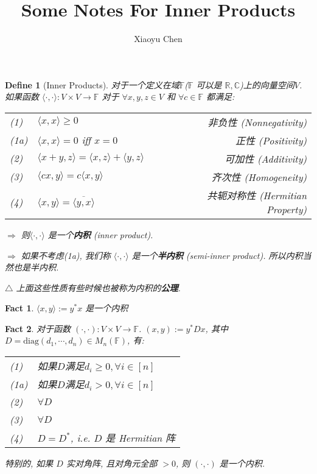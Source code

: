 \documentclass{article}
\title{Some Notes For Inner Products}
\author{Xiaoyu Chen}
\date{}
\newtheorem{define}{Define}
\newtheorem{fact}{Fact}
\def\<{\langle}
\def\>{\rangle}
\begin{document}
\maketitle
\begin{define}[Inner Products]
  对于一个定义在域$\mathbb{F}$($\mathbb{F}$ 可以是 $\mathbb{R}, \mathbb{C}$)上的向量空间$V$. 如果函数 $\< \cdot, \cdot \>: V\times V \to \mathbb{F}$ 对于 $\forall x, y, z\in V$ 和 $\forall c\in \mathbb{F}$ 都满足:

  \begin{tabularx}{0.9\textwidth}{llXr}
    (1) & $\< x, x \> \geq 0$ && 非负性 (Nonnegativity) \\
    (1a) & $\< x, x \> = 0$ iff $x = 0$ && 正性 (Positivity) \\
    (2) & $\< x + y, z \> = \< x, z \> + \< y, z \>$ && 可加性 (Additivity) \\
    (3) & $\< cx, y \> = c\< x, y \>$ && 齐次性 (Homogeneity) \\
    (4) & $\< x , y \> = \overline{\< y, x \>}$ && 共轭对称性 (Hermitian Property) \\
  \end{tabularx}

  $\Rightarrow$ 则$\< \cdot, \cdot \>$ 是一个\textbf{内积} (inner product). 
  
  $\Rightarrow$ 如果不考虑(1a), 我们称 $\<\cdot, \cdot\>$ 是一个\textbf{半内积} (semi-inner product). 所以内积当然也是半内积.

  $\triangle$ 上面这些性质有些时候也被称为内积的\textbf{公理}.
\end{define}

\begin{fact}
  $\< x, y \> := y^*x$ 是一个内积
\end{fact}

\begin{fact}
  对于函数 $(\cdot, \cdot): V\times V \to \mathbb{F}$.
  $(x, y) := y^*Dx$, 其中 $D = \mathrm{diag}(d_1, \cdots, d_n) \in M_n(\mathbb{F})$, 有:

  \begin{tabular}{l@{ $\Leftarrow$ }l}
    (1) & 如果$D$满足$d_i \geq 0, \forall i\in [n]$ \\
    (1a) & 如果$D$满足$d_i > 0, \forall i \in [n]$ \\
    (2) & $\forall D$ \\
    (3) & $\forall D$ \\
    (4) & $D = D^*$, i.e. $D$ 是 Hermitian 阵
  \end{tabular}

  特别的, 如果 $D$ 实对角阵, 且对角元全部 $> 0$, 则 $(\cdot, \cdot)$ 是一个内积.
\end{fact}
\end{document}
